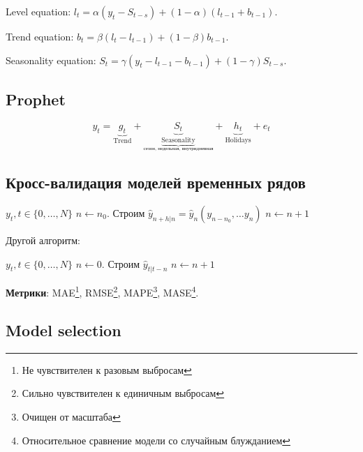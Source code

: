         \noindent Level equation: $l_t = \alpha (y_t - S_{t-s}) + (1-\alpha)(l_{t-1}+b_{t-1})$.

        \noindent Trend equation: $b_t = \beta(l_t - l_{t-1}) + (1-\beta) b_{t-1}$.

        \noindent Seasonality equation: $S_t = \gamma(y_t - l_{t-1} - b_{t-1}) + (1-\gamma) S_{t-s}$.
    
    \subsection{Prophet}
        \begin{equation*}
            y_t = \underbrace{g_t}_{\text{Trend}} + \underbrace{S_t}_{\underbrace{\text{Seasonality}}_{\text{сезон, недельная, внутридневная}}} + \underbrace{h_t}_{\text{Holidays}} + e_t
        \end{equation*}

    \subsection{Кросс-валидация моделей временных рядов}
        \begin{algorithmic}
            \State $y_t, t\in\{0, \dots, N\}$
            \State $n \gets n_0$.
                \State Строим $\hat y_{n+h|n} = \hat y_n (y_{n-n_0}, \dots y_{n})$
                \State $n \gets n+1$
            \EndWhile
        \end{algorithmic}

        Другой алгоритм:
        \begin{algorithmic}
            \State $y_t, t\in\{0, \dots, N\}$
            \State $n \gets 0$.
                \State Строим $\hat y_{t|t-n}$
                \State $n \gets n+1$
            \EndWhile
        \end{algorithmic}

        \textbf{Метрики}: MAE\footnote{Не чувствителен к разовым выбросам}, RMSE\footnote{Сильно чувствителен к единичным выбросам}, MAPE\footnote{Очищен от масштаба}, MASE\footnote{Относительное сравнение модели со случайным блужданием}.

    \subsection{Model selection}
